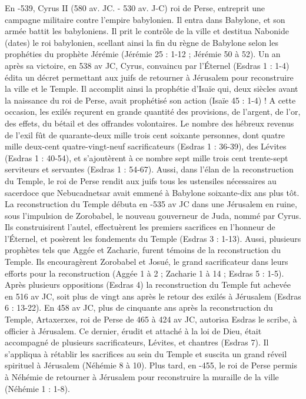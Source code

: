 En -539, Cyrus II (580 av. JC. - 530 av. J-C) roi de Perse, entreprit une campagne militaire contre l'empire babylonien. Il entra dans Babylone, et son armée battit les babyloniens. Il prit le contrôle de la ville et destitua Nabonide (dates) le roi babylonien, scellant ainsi la fin du règne de Babylone selon les prophéties du prophète Jérémie (Jérémie 25 : 1-12 ; Jérémie 50 à 52). Un an après sa victoire, en 538 av JC, Cyrus, convaincu par l’Éternel (Esdras 1 : 1-4) édita un décret permettant aux juifs de retourner à Jérusalem pour reconstruire la ville et le Temple. Il accomplit ainsi la prophétie d'Isaïe qui, deux siècles avant la naissance du roi de Perse, avait prophétisé son action (Isaïe 45 : 1-4) ! A cette occasion, les exilés reçurent en grande quantité des provisions, de l'argent, de l'or, des effets, du bétail et des offrandes volontaires.
Le nombre des hébreux revenus de l'exil fût de quarante-deux mille trois cent soixante personnes, dont quatre mille deux-cent quatre-vingt-neuf sacrificateurs (Esdras 1 : 36-39), des Lévites (Esdras 1 : 40-54), et s'ajoutèrent à ce nombre sept mille trois cent trente-sept serviteurs et servantes (Esdras 1 : 54-67). Aussi, dans l'élan de la reconstruction du Temple, le roi de Perse rendit aux juifs tous les ustensiles nécessaires au sacerdoce que Nebucadnetsar avait emmené à Babylone soixante-dix ans plus tôt.
La reconstruction du Temple débuta en -535 av JC dans une Jérusalem en ruine, sous l'impulsion de Zorobabel, le nouveau gouverneur de Juda, nommé par Cyrus. Ils construisirent l'autel, effectuèrent les premiers sacrifices en l'honneur de l’Éternel, et posèrent les fondements du Temple (Esdras 3 : 1-13). Aussi, plusieurs prophètes tels que Aggée et Zacharie, furent témoins de la reconstruction du Temple. Ils encouragèrent Zorobabel et Josué, le grand sacrificateur dans leurs efforts pour la reconstruction (Aggée 1 à 2 ; Zacharie 1 à 14 ; Esdras 5 : 1-5).
Après plusieurs oppositions (Esdras 4) la reconstruction du Temple fut achevée en 516 av JC, soit plus de vingt ans après le retour des exilés à Jérusalem (Esdras 6 : 13-22).
En 458 av JC, plus de cinquante ans après la reconstruction du Temple, Artaxerxes, roi de Perse de 465 à 424 av JC, autorisa Esdras le scribe, à officier à Jérusalem. Ce dernier, érudit et attaché à la loi de Dieu, était accompagné de plusieurs sacrificateurs, Lévites, et chantres (Esdras 7). Il s'appliqua à rétablir les sacrifices au sein du Temple et suscita un grand réveil spirituel à Jérusalem (Néhémie 8 à 10). Plus tard, en -455, le roi de Perse permis à Néhémie de retourner à Jérusalem pour reconstruire la muraille de la ville (Néhémie 1 : 1-8).
 

